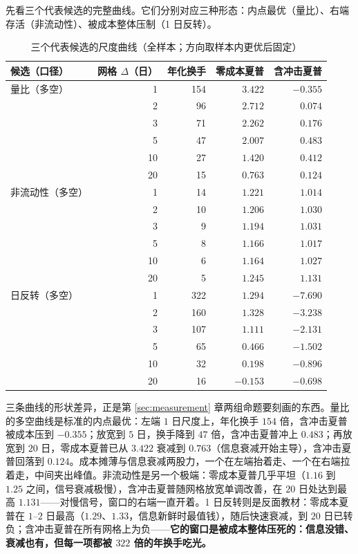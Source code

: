 先看三个代表候选的完整曲线。它们分别对应三种形态：内点最优（量比）、右端存活（非流动性）、被成本整体压制（1 日反转）。

\begin{table}[htbp]
\centering
\caption{三个代表候选的尺度曲线（全样本；方向取样本内更优后固定）}
\label{tab:curves}
\begin{tabular}{@{}>{\raggedright\arraybackslash}p{2.6cm}r r r r@{}}
\toprule
候选（口径） & 网格 $\Delta$（日） & 年化换手 & 零成本夏普 & 含冲击夏普 \\
\midrule
量比（多空） & 1 & 154 & $3.422$ & $-0.355$ \\
              & 2 & 96 & $2.712$ & $0.074$ \\
              & 3 & 71 & $2.262$ & $0.176$ \\
              & 5 & 47 & $2.007$ & $\mathbf{0.483}$ \\
              & 10 & 27 & $1.420$ & $0.412$ \\
              & 20 & 15 & $0.763$ & $0.124$ \\
\midrule
非流动性（多空） & 1 & 14 & $1.221$ & $1.014$ \\
              & 2 & 10 & $1.206$ & $1.030$ \\
              & 3 & 9 & $1.194$ & $1.031$ \\
              & 5 & 8 & $1.166$ & $1.017$ \\
              & 10 & 6 & $1.164$ & $1.027$ \\
              & 20 & 5 & $1.245$ & $\mathbf{1.131}$ \\
\midrule
1 日反转（多空） & 1 & 322 & $1.294$ & $-7.690$ \\
              & 2 & 160 & $1.328$ & $-3.238$ \\
              & 3 & 107 & $1.111$ & $-2.131$ \\
              & 5 & 65 & $0.466$ & $-1.502$ \\
              & 10 & 32 & $0.198$ & $-0.896$ \\
              & 20 & 16 & $-0.153$ & $-0.698$ \\
\bottomrule
\end{tabular}
\end{table}

三条曲线的形状差异，正是第 \ref{sec:measurement} 章两组命题要刻画的东西。量比的多空曲线是标准的内点最优：左端 $1$ 日尺度上，年化换手 $154$ 倍，含冲击夏普被成本压到 $-0.355$；放宽到 $5$ 日，换手降到 $47$ 倍，含冲击夏普冲上 $0.483$；再放宽到 $20$ 日，零成本夏普已从 $3.422$ 衰减到 $0.763$（信息衰减开始主导），含冲击夏普回落到 $0.124$。成本摊薄与信息衰减两股力，一个在左端抬着走、一个在右端拉着走，中间夹出峰值。非流动性是另一个极端：零成本夏普几乎平坦（$1.16$ 到 $1.25$ 之间，信号衰减极慢），含冲击夏普随网格放宽单调改善，在 $20$ 日处达到最高 $1.131$——对慢信号，窗口的右端一直开着。1 日反转则是反面教材：零成本夏普在 $1$--$2$ 日最高（$1.29$、$1.33$，信息新鲜时最值钱），随后快速衰减，到 $20$ 日已转负；含冲击夏普在所有网格上为负——\textbf{它的窗口是被成本整体压死的：信息没错、衰减也有，但每一项都被 $322$ 倍的年换手吃光。}

